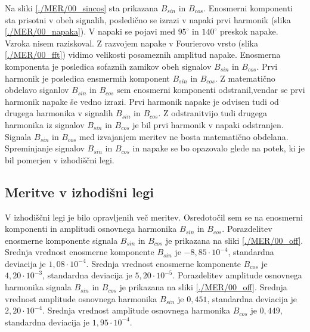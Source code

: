 Na sliki \ref{./MER/00_sincos} sta prikazana $B_{sin}$ in $B_{cos}$. Enosmerni komponenti sta prisotni v obeh signalih, posledično se izrazi v napaki prvi harmonik (slika \ref{./MER/00_napaka}).
V napaki se pojavi med $\mathrm{95^\circ}$ in $\mathrm{140^\circ}$ preskok napake. Vzroka nisem raziskoval.
Z razvojem napake v Fourierovo vrsto (slika \ref{./MER/00_fft}) vidimo velikosti posameznih amplitud napake.
Enosmerna komponenta je posledica sofaznih zamikov obeh signalov $B_{sin}$ in $B_{cos}$. 
Prvi harmonik je posledica ensmermih komponent $B_{sin}$ in $B_{cos}$. Z matematično obdelavo siganlov $B_{sin}$ in $B_{cos}$ sem enosmerni komponenti odstranil,vendar se prvi harmonik napake še vedno izrazi. Prvi harmonik napake je odvisen tudi od drugega harmonika v signalih $B_{sin}$ in $B_{cos}$.
Z odstranitvijo tudi drugega harmonika iz signalov $B_{sin}$ in $B_{cos}$ je bil  prvi harmonik v napaki odstranjen.
Signala  $B_{sin}$ in $B_{cos}$ med izvajanjem meritev ne bosta  matematično obdelana. Spreminjanje signalov  $B_{sin}$ in $B_{cos}$ in napake se bo opazovalo glede na potek, ki je bil pomerjen v izhodiščni legi.
\newpage

\subsection{Meritve v izhodišni legi}
V izhodiščni legi je bilo opravljenih več meritev. Osredotočil sem se na enosmerni komponenti  in amplitudi osnovnega harmonika $B_{sin}$ in $B_{cos}$. 
Porazdelitev enosmerne komponente signala $B_{sin}$ in $B_{cos}$ je prikazana na sliki \ref{./MER/00_off}.
Srednja vrednost enosmerne komponente $B_{sin}$ je $-8,85 \cdot 10^{-4}$, standardna deviacija je $1,08\cdot 10^{-4}$.
Srednja vrednost enosmerne komponente $B_{cos}$ je $4,20 \cdot 10^{-3}$, standardna deviacija je $5,20\cdot 10^{-5}$.
Porazdelitev amplitude osnovnega harmonika signala $B_{sin}$ in $B_{cos}$ je prikazana na sliki \ref{./MER/00_off}.
Srednja vrednost amplitude osnovnega harmonika $B_{sin}$ je $0,451$, standardna deviacija je $2,20\cdot 10^{-4}$.
Srednja vrednost amplitude osnovnega harmonika $B_{cos}$ je $0,449$, standardna deviacija je $1,95\cdot 10^{-4}$.
\newpage
